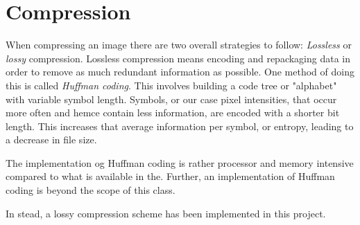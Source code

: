 \section{Compression}
When compressing an image there are two overall strategies to follow:
\emph{Lossless} or \emph{lossy} compression.
Lossless compression means encoding and repackaging data in order to remove as much redundant information as possible. 
One method of doing this is called \emph{Huffman coding}.
This involves building a code tree or "alphabet" with variable symbol length.
Symbols, or our case pixel intensities, that occur more often and hemce contain less information, are encoded with a shorter bit length. 
This increases that average information per symbol, or entropy, leading to a decrease in file size.

The implementation og Huffman coding is rather processor and memory intensive compared to what is available in the.
Further, an implementation of Huffman coding is beyond the scope of this class.

In stead, a lossy compression scheme has been implemented in this project.